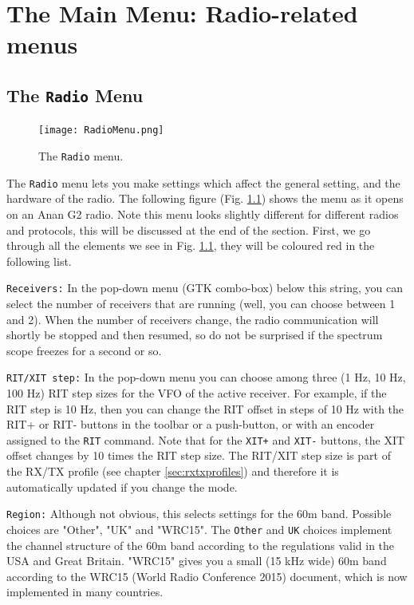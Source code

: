 \documentclass[12pt]{book}
\def\rett#1{\texttt{\color{red}#1}}
\def\bltt#1{\texttt{\color{blue}#1}}
\begin{document}
\chapter[Radio-related menus]{The Main Menu: Radio-related menus}
\section{The \texttt{Radio} Menu}

\begin{figure}[ht]
\center
\texttt{[image: RadioMenu.png]}
\caption{The \bltt{Radio} menu.}
\label{fig:RadioMenu}
\end{figure}


The \bltt{Radio} menu lets you make settings which affect the general setting, and the hardware of the
radio.
The following figure (Fig. \ref{fig:RadioMenu}) shows the menu as it opens on an Anan G2 radio.
Note this menu looks slightly different for different radios and protocols, this will be discussed
at the end of the section. First, we go through all the elements we see in Fig. \ref{fig:RadioMenu},
they will be coloured red in the following list.

\rett{Receivers:} In the pop-down menu (GTK combo-box) below this string, you can select the number
of receivers that are running (well, you can choose between 1 and 2). When the number of receivers change,
the radio communication will shortly be stopped and then resumed, so do not be surprised if the spectrum
scope freezes for a second or so.

\rett{RIT/XIT step:} In the pop-down menu you can choose among three (1 Hz, 10 Hz, 100 Hz) RIT step sizes
for the VFO of the active receiver. For example, if the RIT step is 10 Hz, then you can change the RIT offset
in steps of 10 Hz with the RIT+ or RIT- buttons in the toolbar or a push-button, or with
an encoder assigned to the \bltt{RIT} command. Note that for the
\bltt{XIT+} and \bltt{XIT-} buttons, the XIT offset changes by 10 times the RIT step size. The RIT/XIT step
size is part of the RX/TX profile (see chapter \ref{sec:rxtxprofiles}) and therefore it is automatically updated
if you change the mode.

\rett{Region:} Although not obvious, this selects settings for the 60m band. Possible choices are "Other",
"UK" and "WRC15". The \texttt{Other} and \texttt{UK} choices implement the channel structure of the 60m
band according to the regulations valid in the USA and Great Britain. "WRC15" gives you a small (15 kHz
wide) 60m band according to the WRC15 (World Radio Conference 2015) document, which is now implemented in
many countries.
\end{document}
